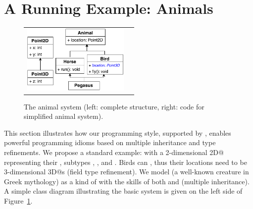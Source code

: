 \section{A Running Example: Animals}\label{sec:ep}
\begin{figure}
\centering
\saveSpaceFig
\begin{tabular}{c|c}
\includegraphics[height=3.3cm]{pdfs/PegasusDetail.pdf}\hspace{0pt} &
\begin{minipage}{7cm}
\vspace{-95pt}
\end{minipage}
\end{tabular}
\caption{The animal system (left: complete structure, right: code for simplified animal system).}\label{fig:pegasus}
\saveSpaceFig
\end{figure}

This section illustrates how our programming style, supported by 
\mixinAnn{}, enables powerful programming idioms based on multiple
inheritance and type refinements.  We propose a standard example:
\Q@Animal@s with a 2-dimensional \Q@Point2D@ representing their
\Q@location@, subtypes \Q@Horses@, \Q@Bird@s, and \Q@Pegasus@.
Birds can \Q@fly@, thus their locations need to be 3-dimensional
\Q@Point3D@s (field type refinement). We model \Q@Pegasus@
(a well-known creature in Greek mythology) as a kind of
\Q@Animal@ with the skills of both \Q@Horse@s and \Q@Bird@s (multiple
inheritance). A simple class diagram illustrating the basic system is
given on the left side of Figure~\ref{fig:pegasus}.


